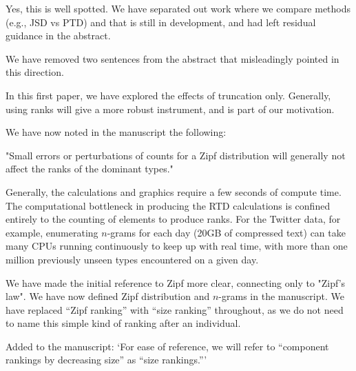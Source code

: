
Yes, this is well spotted. We have separated out work where we compare
methods (e.g., JSD vs PTD) and that is still in development, and had left
residual guidance in the abstract.

We have removed two sentences from the abstract that misleadingly pointed in this direction.


In this first paper, we have explored the effects of truncation only.
Generally, using ranks will give a more robust instrument, and is part of our motivation.

We have now noted in the manuscript the following:

"Small errors or perturbations of counts for a Zipf distribution 
will generally not affect the ranks of the dominant types."


Generally, the calculations and graphics require a few seconds of compute time.
The computational bottleneck in producing the RTD calculations is confined entirely to the counting of elements to produce ranks.
For the Twitter data, for example, enumerating $n$-grams for each day (20GB of compressed text) can take many CPUs running continuously to keep up with real time, with more than one million previously unseen types encountered on a given day.


We have made the initial reference to Zipf more clear, connecting only to "Zipf's law".
We have now defined Zipf distribution and $n$-grams in the manuscript. 
We have replaced ``Zipf ranking'' with ``size ranking'' throughout, as we do not need
to name this simple kind of ranking after an individual.

Added to the manuscript:
`For ease of reference, we will refer to
``component rankings by decreasing size'' as ``size rankings.'''

